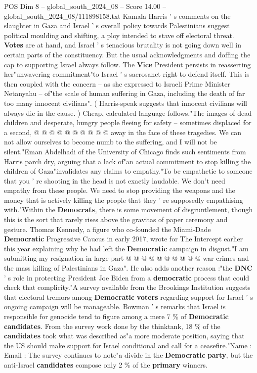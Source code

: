 \begin{textsample}{POS Dim 8 – global\_south\_2024\_08 – Score 14.00 – global\_south\_2024\_08/111898158.txt}
Kamala Harris ' s comments on the slaughter in Gaza and Israel ' s overall policy towards Palestinians suggest political moulding and shifting, a ploy intended to stave off electoral threat. \textbf{Votes} are at hand, and Israel ' s tenacious brutality is not going down well in certain parts of the constituency.
But the usual acknowledgments and doffing the cap to supporting Israel always follow.
The \textbf{Vice} President persists in reasserting her"unwavering commitment"to Israel ' s sacrosanct right to defend itself.
This is then coupled with the concern -- as she expressed to Israeli Prime Minister Netanyahu -- of"the scale of human suffering in Gaza, including the death of far too many innocent civilians". ( Harris-speak suggests that innocent civilians will always die in the cause. ) Cheap, calculated language follows."The images of dead children and desperate, hungry people fleeing for safety -- sometimes displaced for a second, @ @ @ @ @ @ @ @ @ @ away in the face of these tragedies.
We can not allow ourselves to become numb to the suffering, and I will not be silent."Eman Abdelhadi of the University of Chicago finds such sentiments from Harris parch dry, arguing that a lack of"an actual commitment to stop killing the children of Gaza"invalidates any claims to empathy."To be empathetic to someone that you ' re shooting in the head is not exactly laudable.
We don't need empathy from these people.
We need to stop providing the weapons and the money that is actively killing the people that they ' re supposedly empathising with."Within the \textbf{Democrats}, there is some movement of disgruntlement, though this is the sort that rarely rises above the gravitas of paper ceremony and gesture.
Thomas Kennedy, a figure who co-founded the Miami-Dade \textbf{Democratic} Progressive Caucus in early 2017, wrote for The Intercept earlier this year explaining why he had left the \textbf{Democratic} campaign in disgust."I am submitting my resignation in large part @ @ @ @ @ @ @ @ @ @ war crimes and the mass killing of Palestinians in Gaza".
He also adds another reason :"the \textbf{DNC} ' s role in protecting President Joe Biden from a \textbf{democratic} process that could check that complicity."A survey available from the Brookings Institution suggests that electoral tremors among \textbf{Democratic} \textbf{voters} regarding support for Israel ' s ongoing campaign will be manageable.
Bowman ' s remarks that Israel is responsible for genocide tend to figure among a mere 7 \% of \textbf{Democratic} \textbf{candidates}.
From the survey work done by the thinktank, 18 \% of the \textbf{candidates} took what was described as"a more moderate position, saying that the US should make support for Israel conditional and call for a ceasefire."Name : Email : The survey continues to note"a divide in the \textbf{Democratic} \textbf{party}, but the anti-Israel \textbf{candidates} compose only 2 \% of the \textbf{primary} winners.

\end{textsample}
